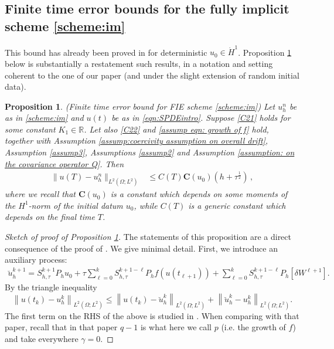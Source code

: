 \documentclass[reqno, 11pt]{amsart}
\theoremstyle{plain}
\newtheorem{proposition}[theorem]{Proposition}
\theoremstyle{definition}
\theoremstyle{remark}
\numberwithin{equation}{section}
\numberwithin{theorem}{section}
\newcommand{\R}{\mathbb{R}}
\newcommand{\con}{\mathbf{C}}
\begin{document}
{\subsection{Finite time error bounds for the fully implicit scheme \eqref{scheme:im}} \label{subsec:proof of H2 for fully implicit} This bound has already been proved in \cite{liu2021strong} for deterministic $u_0\in \dot{H}^1$. Proposition \ref{Prop: finite tim error implicit} below  is substantially a restatement such results, in a notation and setting coherent to the one of our paper (and under the slight extension of random initial data).  

\begin{proposition}\label{Prop: finite tim error implicit}(Finite time error bound for FIE scheme  \eqref{scheme:im})
 Let $u_h^n$ be as in \eqref{scheme:im} and $u(t)$ be as in \eqref{eqn:SPDEintro}.  Suppose  \eqref{C21} holds for some constant $K_1 \in \R$.  Let also  \eqref{C22} and \eqref{assump eqn: growth of f} hold, together with  Assumption \ref{assump:coercivity assumption on overall drift}, Assumption \ref{assump3}, Assumptions \ref{assump2} and Assumption \ref{assumption: on the covariance operator Q}. Then 
\begin{align}\label{cimu0}
\|u(T)-u_h^n\|_{L^2(\Omega;L^2)}&\leq C(T) \con(u_0)(h+\tau^{\frac{1}{2}}) \, ,
\end{align}
where we recall that $\con(u_0)$ is a constant which depends on some moments of the $H^1$-norm of the initial datum $u_0$, while $C(T)$ is a generic constant which depends on the final time $T$. 
\end{proposition}

\begin{proof}[Sketch of proof of Proposition \ref{Prop: finite tim error implicit}] The statements of this proposition are a direct consequence of  the proof of \cite[Lemma 4.2 and Theorem 1.1]{liu2021strong}. We give minimal detail.  
First, we introduce an auxiliary process: 
\begin{align}\label{eq:uhatdef}
\breve{u}_h^{k+1}=S_{h,\tau}^{k+1}P_hu_0+\tau\sum\limits_{\ell=0}^kS_{h,\tau}^{k+1-\ell}P_hf(u(t_{\ell+1}))+\sum\limits_{\ell=0}^k S_{h,\tau}^{k+1-\ell}P_h[\delta W^{\ell+1}].
\end{align}
By the triangle inequality
\begin{equation}\label{eqn: use split implicit}
\left\|u\left(t_k\right)-u_h^k\right\|_{L^{2}(\Omega ; L^2)} \leq\left\|u\left(t_k\right)-\breve{u}_h^k\right\|_{L^{2}(\Omega ; L^2)}+\left\|\breve{u}_h^k-u_h^k\right\|_{L^{2}(\Omega ; L^2)}.
\end{equation}
The first term on the RHS of the above is studied in \cite[Lemma 4.2]{liu2021strong}. When comparing with that paper, recall that in that paper $q-1$ is what here we call $p$ (i.e. the growth of $f$) and take everywhere $\gamma=0$.   



\end{proof}}
\end{document}
